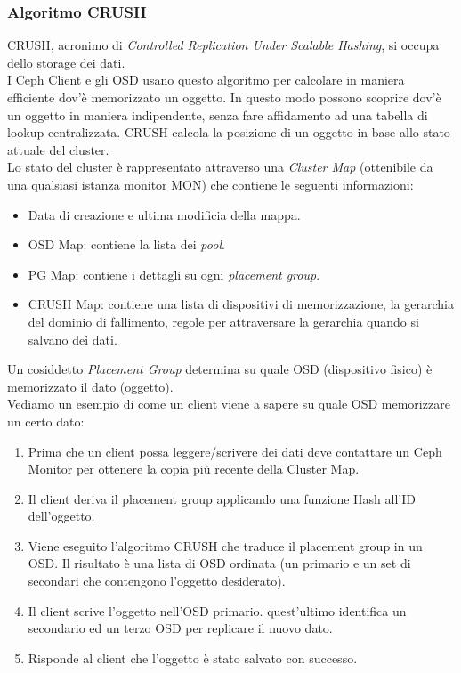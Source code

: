 \documentclass{article}
\begin{document}
\subsubsection{Algoritmo CRUSH}
CRUSH, acronimo di \textit{Controlled Replication Under Scalable Hashing}, si occupa dello storage dei dati.\\
I Ceph Client e gli OSD usano questo algoritmo per calcolare in maniera efficiente dov'è memorizzato un oggetto. In questo modo possono scoprire dov'è un oggetto in maniera indipendente, senza fare affidamento ad una tabella di lookup centralizzata. CRUSH calcola la posizione di un oggetto in base allo stato attuale del cluster.\\
Lo stato del cluster è rappresentato attraverso una \textit{Cluster Map} (ottenibile da una qualsiasi istanza monitor MON) che contiene le seguenti informazioni:
\begin{itemize}
    \item Data di creazione e ultima modificia della mappa.
    \item OSD Map: contiene la lista dei \textit{pool}\footnotemark.
    \item PG Map: contiene i dettagli su ogni \textit{placement group}.
    \item CRUSH Map: contiene una lista di dispositivi di memorizzazione, la gerarchia del dominio di fallimento, regole per attraversare la gerarchia quando si salvano dei dati.
\end{itemize}
Un cosiddetto \textit{Placement Group} determina su quale OSD (dispositivo fisico)  è memorizzato il dato (oggetto).\\
Vediamo un esempio di come un client viene a sapere su quale OSD memorizzare un certo dato:
\begin{enumerate}
    \item Prima che un client possa leggere/scrivere dei dati deve contattare un Ceph Monitor per ottenere la copia più recente della Cluster Map.
    \item Il client deriva il placement group applicando una funzione Hash all'ID dell'oggetto.
    \item Viene eseguito l'algoritmo CRUSH che traduce il placement group in un OSD. Il risultato è una lista di OSD ordinata (un primario e un set di secondari che contengono l'oggetto desiderato).
    \item Il client scrive l'oggetto nell'OSD primario. quest'ultimo identifica un secondario ed un terzo OSD per replicare il nuovo dato.
    \item Risponde al client che l'oggetto è stato salvato con successo.
\end{enumerate}
\end{document}
